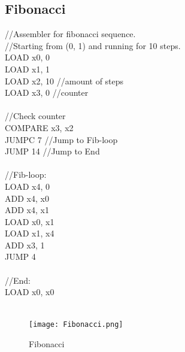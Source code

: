 \documentclass{scrartcl}
\begin{document}
\subsection{Fibonacci}
\begin{multicols}{2}
//Assembler for fibonacci sequence.\\
//Starting from (0, 1) and running for 10 steps.\\
LOAD x0, 0\\
LOAD x1, 1\\
LOAD x2, 10 //amount of steps\\
LOAD x3, 0 //counter\\
\\
//Check counter\\
COMPARE x3, x2\\
JUMPC 7 //Jump to Fib-loop\\
JUMP 14 //Jump to End\\
\\
//Fib-loop:\\
LOAD x4, 0\\
ADD x4, x0\\
ADD x4, x1\\
LOAD x0, x1\\
LOAD x1, x4\\
ADD x3, 1\\
JUMP 4\\
\\
//End:\\
LOAD x0, x0\\
\\
\end{multicols}
\begin{figure}[H]
    \centering
    \texttt{[image: Fibonacci.png]}
    \caption{Fibonacci}
    \label{fig:Fibonacci}
\end{figure}
\newpage
\end{document}
